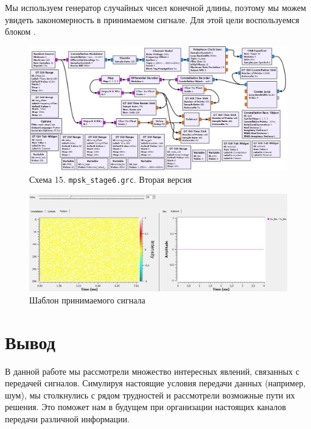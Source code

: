 \documentclass[a4paper, 12pt]{report}
\begin{document}
	Мы используем генератор случайных чисел конечной длины, поэтому мы можем увидеть закономерность в принимаемом сигнале. Для этой цели воспользуемся блоком .
	\begin{figure}[H]
		\centering
		\includegraphics[width=1.0\textwidth]{43.jpg}
		\caption{Схема 15. \texttt{mpsk\_stage6.grc}. Вторая версия}
		\label{fig:43}
	\end{figure}
	\begin{figure}[H]
		\centering
		\includegraphics[width=1.0\textwidth]{42.jpg}
		\caption{Шаблон принимаемого сигнала}
		\label{fig:42}
	\end{figure}

	\chapter{Вывод}
	В данной работе мы рассмотрели множество интересных явлений, связанных с передачей сигналов. Симулируя настоящие условия передачи данных (например, шум), мы столкнулись с рядом трудностей и рассмотрели возможные пути их решения. Это поможет нам в будущем при организации настоящих каналов передачи различной информации.
\end{document}
